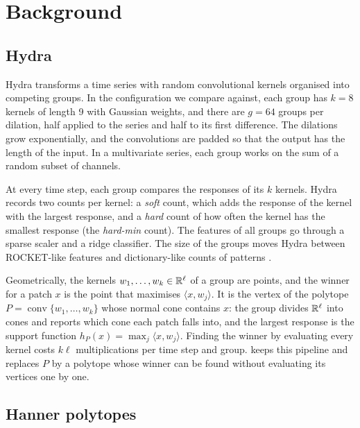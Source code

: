 \section{Background}
\label{sec:background}

\subsection{Hydra}
\label{sec:hydra}

Hydra \citep{dempster2023hydra} transforms a time series with random convolutional kernels
organised into competing groups. In the configuration we compare against, each group has
$k=8$ kernels of length 9 with Gaussian weights, and there are $g=64$ groups per dilation,
half applied to the series and half to its first difference. The dilations grow
exponentially, and the convolutions are padded so that the output has the length of the
input. In a multivariate series, each group works on the sum of a random subset of
channels.

At every time step, each group compares the responses of its $k$ kernels. Hydra records two
counts per kernel: a \emph{soft} count, which adds the response of the kernel with the
largest response, and a \emph{hard} count of how often the kernel has the smallest response
(the \emph{hard-min} count). The features of all groups go through a sparse scaler and a
ridge classifier. The size of the groups moves Hydra between ROCKET-like features
\citep{dempster2020rocket} and dictionary-like counts of patterns
\citep{dempster2023hydra}.

Geometrically, the kernels $w_1,\dots,w_k\in\mathbb{R}^\ell$ of a group are points, and the winner
for a patch $x$ is the point that maximises $\langle x,w_j\rangle$. It is the vertex of the
polytope $P=\operatorname{conv}\{w_1,\dots,w_k\}$ whose normal cone contains $x$: the group
divides $\mathbb{R}^\ell$ into cones and reports which cone each patch falls into, and the largest
response is the support function $h_P(x)=\max_j\langle x,w_j\rangle$. Finding the winner by
evaluating every kernel costs $k\ell$ multiplications per time step and group. \hh{} keeps
this pipeline and replaces $P$ by a polytope whose winner can be found without evaluating
its vertices one by one.

\subsection{Hanner polytopes}
\label{sec:hanner}

